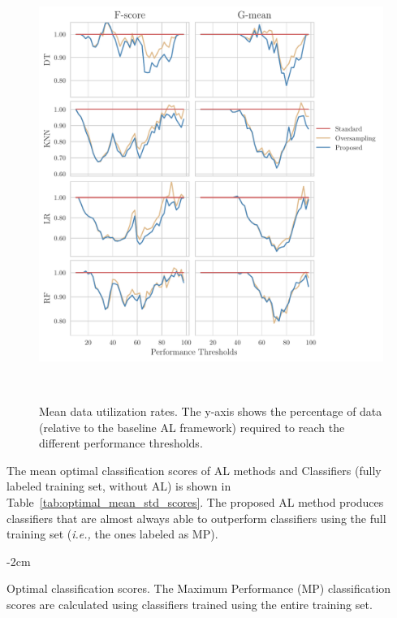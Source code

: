 \documentclass[parskip=full]{scrartcl}
\begin{document}
\begin{figure}[H]
	\centering
	\includegraphics[width=1\linewidth]{../analysis/data_utilization_rate}
    \caption{%
        Mean data utilization rates. The y-axis shows the percentage of data
        (relative to the baseline AL framework) required to reach the
        different performance thresholds.
    }~\label{fig:dur}
\end{figure}

The mean optimal classification scores of AL methods and Classifiers (fully
labeled training set, without AL) is shown in
Table~\ref{tab:optimal_mean_std_scores}. The proposed AL method produces
classifiers that are almost always able to outperform classifiers using the
full training set (\textit{i.e.,} the ones labeled as MP).

\begin{table}[H]
    \centering
    \addtolength{\leftskip} {-2cm}
    \addtolength{\rightskip}{-2cm}
    \caption{\label{tab:optimal_mean_std_scores}
        Optimal classification scores. The Maximum Performance (MP)
        classification scores are calculated using classifiers trained using
        the entire training set.
    }
\end{table}
\end{document}
